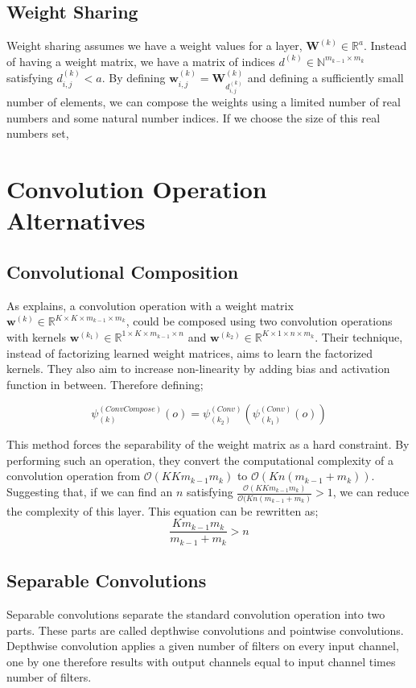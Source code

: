\subsection{Weight Sharing}
Weight sharing assumes we have a weight values for a layer, $\mathbf{W}^{(k)} \in \mathbb{R}^{a}$. Instead of having a weight matrix, we have a matrix of indices $d^{(k)} \in \mathbb{N}^{m_{k-1} \times m_k}$ satisfying $d^{(k)}_{i,j} < a$. By defining $\mathbf{w}^{(k)}_{i,j} = \mathbf{W}^{(k)}_{d^{(k)}_{i,j}}$ and defining a sufficiently small number of elements, we can compose the weights using a limited number of real numbers and some natural number indices. If we choose the size of this real numbers set, 


\section{Convolution Operation Alternatives}

\subsection{Convolutional Composition}
As  \cite{alvarez2016decomposeme} explains, a convolution operation with a weight matrix $\mathbf{w}^{(k)} \in \mathbb{R}^{K \times K \times m_{k-1} \times m_k}$, could be composed using two convolution operations with kernels $\mathbf{w}^{(k_1)} \in \mathbb{R}^{1 \times K \times m_{k-1} \times n}$ and $\mathbf{w}^{(k_2)} \in \mathbb{R}^{K \times 1 \times n \times m_k}$. Their technique, instead of factorizing learned weight matrices, aims to learn the factorized kernels. They also aim to increase non-linearity by adding bias and activation function in between. Therefore defining;

$$ \psi_{(k)}^{(ConvCompose)}(o) = \psi_{(k_2)}^{(Conv)}(\psi_{(k_1)}^{(Conv)}(o))$$

This method forces the separability of the weight matrix as a hard constraint. By performing such an operation, they convert the computational complexity of a convolution operation from $\mathcal{O}(KKm_{k-1}m_k)$ to $\mathcal{O}(Kn(m_{k-1} +m_{k}))$. Suggesting that, if we can find an $n$ satisfying $\frac{\mathcal{O}(KKm_{k-1}m_k)}{\mathcal{O}(Kn(m_{k-1} +m_{k})} > 1$, we can reduce the complexity of this layer. This equation can be rewritten as;
$$ \frac{Km_{k-1}m_k}{m_{k-1} + m_k} > n$$


\subsection{Separable Convolutions}
Separable convolutions separate the standard convolution operation into two parts. These parts are called depthwise convolutions and pointwise convolutions. Depthwise convolution applies a given number of filters on every input channel, one by one therefore results with output channels equal to input channel times number of filters. 
